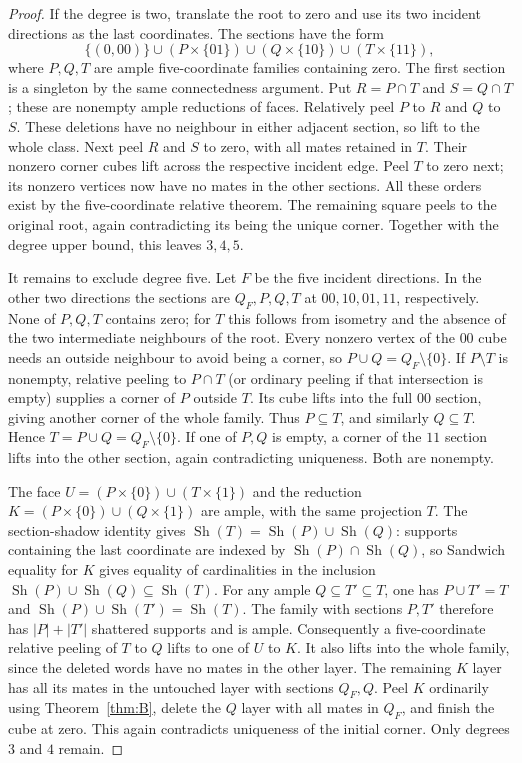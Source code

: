 \documentclass[11pt]{article}
\numberwithin{equation}{section}
\theoremstyle{definition}
\theoremstyle{remark}
\newcommand{\Sh}{\operatorname{Sh}}
\begin{document}
\begin{proof}
If the degree is two, translate the root to zero and use its two
incident directions as the last coordinates. The sections have the form
\[
 \{(0,00)\}\cup(P\times\{01\})
 \cup(Q\times\{10\})\cup(T\times\{11\}),
\]
where $P,Q,T$ are ample five-coordinate families containing zero.
The first section is a singleton by the same connectedness argument.
Put $R=P\cap T$ and $S=Q\cap T$; these are nonempty ample
reductions of faces. Relatively peel $P$ to $R$ and $Q$ to $S$.
These deletions have no neighbour in either adjacent section, so lift
to the whole class. Next peel $R$ and $S$ to zero, with all mates
retained in $T$. Their nonzero corner cubes lift across the respective
incident edge. Peel $T$ to zero next; its nonzero vertices now have
no mates in the other sections. All these orders exist by the
five-coordinate relative theorem. The remaining square peels to the
original root, again contradicting its being the unique corner.
Together with the degree upper bound, this leaves $3,4,5$.

It remains to exclude degree five. Let $F$ be the five incident
directions. In the other two directions the sections are
$Q_F,P,Q,T$ at $00,10,01,11$, respectively. None of $P,Q,T$
contains zero; for $T$ this follows from isometry and the absence
of the two intermediate neighbours of the root. Every nonzero
vertex of the $00$ cube needs an outside neighbour to avoid being
a corner, so $P\cup Q=Q_F\setminus\{0\}$.
If $P\setminus T$ is nonempty, relative peeling to $P\cap T$
(or ordinary peeling if that intersection is empty) supplies a
corner of $P$ outside $T$. Its cube lifts into the full $00$
section, giving another corner of the whole family. Thus $P\subseteq T$,
and similarly $Q\subseteq T$. Hence $T=P\cup Q=Q_F\setminus\{0\}$.
If one of $P,Q$ is empty, a corner of the $11$ section lifts into
the other section, again contradicting uniqueness. Both are nonempty.

The face $U=(P\times\{0\})\cup(T\times\{1\})$ and the reduction
$K=(P\times\{0\})\cup(Q\times\{1\})$ are ample, with the same
projection $T$. The section-shadow identity gives
$\Sh(T)=\Sh(P)\cup\Sh(Q)$: supports containing the last coordinate
are indexed by $\Sh(P)\cap\Sh(Q)$, so Sandwich equality for $K$
gives equality of cardinalities in the inclusion
$\Sh(P)\cup\Sh(Q)\subseteq\Sh(T)$.
For any ample $Q\subseteq T'\subseteq T$, one has $P\cup T'=T$
and $\Sh(P)\cup\Sh(T')=\Sh(T)$. The family with sections $P,T'$
therefore has $|P|+|T'|$ shattered supports and is ample.
Consequently a five-coordinate relative peeling of $T$ to $Q$
lifts to one of $U$ to $K$. It also lifts into the whole family,
since the deleted words have no mates in the other layer.
The remaining $K$ layer has all its mates in the untouched layer
with sections $Q_F,Q$. Peel $K$ ordinarily using Theorem~\ref{thm:B},
delete the $Q$ layer with all mates in $Q_F$, and finish the cube
at zero. This again contradicts uniqueness of the initial corner.
Only degrees $3$ and $4$ remain.
\end{proof}
\end{document}
